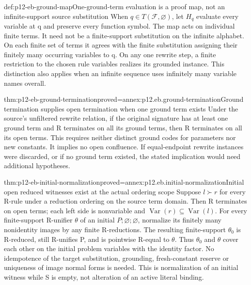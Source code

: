 \begin{hbdefinition}{def:p12-eb-ground-map}{One-ground-term evaluation is a proof map, not an infinite-support source substitution}
When \(q\in T(\mathcal F,\varnothing)\), let \(H_q\) evaluate
every variable at q and preserve every function symbol. The map acts
on individual finite terms. It need not be a finite-support
substitution on the infinite alphabet. On each finite set of terms
it agrees with the finite substitution assigning their finitely
many occurring variables to q. On any one rewrite step, a finite
restriction to the chosen rule variables realizes its grounded
instance. This distinction also applies when an infinite sequence
uses infinitely many variable names overall.
\end{hbdefinition}

\begin{hblemma}{thm:p12-eb-ground-termination}{proved=annex:p12.eb.ground-termination}{Ground termination supplies open termination when one ground term exists}
Under the source's unfiltered rewrite relation, if the original
signature has at least one ground term and R terminates on all
its ground terms, then R terminates on all its open terms.
This requires neither distinct ground codes for parameters nor
new constants. It implies no open confluence. If equal-endpoint
rewrite instances were discarded, or if no ground term existed,
the stated implication would need additional hypotheses.
\end{hblemma}

\begin{hblemma}{thm:p12-eb-initial-normalization}{proved=annex:p12.eb.initial-normalization}{Initial open reduced witnesses exist at the actual ordering scope}
Suppose \(l\succ r\) for every R-rule under a reduction ordering
on the source term domain. Then R terminates on open terms;
each left side is nonvariable and
\(\operatorname{Var}(r)\subseteq\operatorname{Var}(l)\).
For every finite-support R-unifier \(\theta\) of an initial
\(P;\varnothing;\varnothing\), normalize its finitely many
nonidentity images by any finite R-reductions. The resulting
finite-support \(\theta_0\) is R-reduced, still R-unifies P,
and is pointwise R-equal to \(\theta\). Thus \(\theta_0\) and
\(\theta\) cover each other on the initial problem variables
with the identity factor. No idempotence of the target substitution,
grounding, fresh-constant reserve or uniqueness of image normal
forms is needed. This is normalization of an initial witness while
S is empty, not alteration of an active literal binding.
\end{hblemma}

